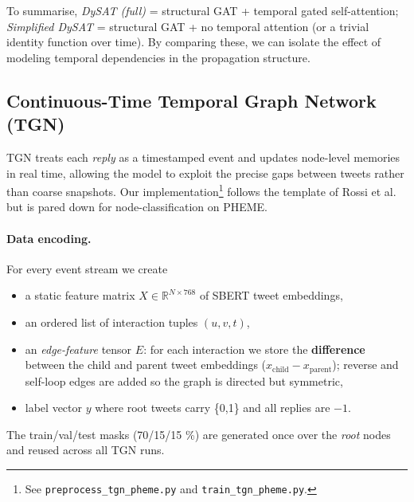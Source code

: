\documentclass{cshonours}
\begin{document}
To summarise, \emph{DySAT (full)} = structural GAT + temporal gated self-attention; \emph{Simplified DySAT} = structural GAT + no temporal attention (or a trivial identity function over time). By comparing these, we can isolate the effect of modeling temporal dependencies in the propagation structure.

\subsection{Continuous-Time Temporal Graph Network (TGN)}
\label{subsec:tgn}

TGN treats each \emph{reply} as a timestamped event and updates node-level memories in real time, allowing the model to exploit the precise gaps between tweets rather than coarse snapshots.  
Our implementation\footnote{See \texttt{preprocess\_tgn\_pheme.py} and \texttt{train\_tgn\_pheme.py}.} follows the template of Rossi et al.~\cite{rossi2020tgn} but is pared down for node-classification on PHEME.

\paragraph{Data encoding.}
For every event stream we create
\begin{itemize}
    \item a static feature matrix $X\!\in\!\mathbb{R}^{N\times768}$ of SBERT tweet embeddings,
    \item an ordered list of interaction tuples $(u,v,t)$,
    \item an \emph{edge-feature} tensor $E$: for each interaction we store the \textbf{difference} between the child and parent tweet embeddings ($x_{\text{child}}-x_{\text{parent}}$); reverse and self-loop edges are added so the graph is directed but symmetric,
    \item label vector $y$ where root tweets carry \{0,1\} and all replies are $-1$.
\end{itemize}
The train/val/test masks (70/15/15 \%) are generated once over the \emph{root} nodes and reused across all TGN runs.
\end{document}

